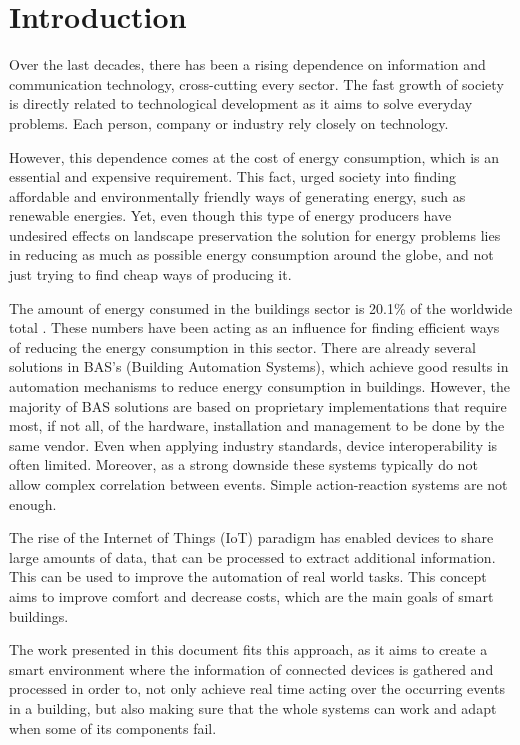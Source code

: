

\chapter{Introduction}
\label{chapter:introduction}

Over the last decades, there has been a rising dependence on information and communication technology, cross-cutting every sector. The fast growth of society is directly related to technological development as it aims to solve everyday problems. Each person, company or industry rely closely on technology.

However, this dependence comes at the cost of energy consumption, which is an essential and expensive requirement. This fact, urged society into finding affordable and environmentally friendly ways of generating energy, such as renewable energies. Yet, even though this type of energy producers have undesired effects on landscape preservation the solution for energy problems lies in reducing as much as possible energy consumption around the globe, and not just trying to find cheap ways of producing it.


The amount of energy consumed in the buildings sector is 20.1\% of the worldwide total \cite{BuildingEnergy}. These numbers have been acting as an influence for finding efficient ways of reducing the energy consumption in this sector. There are already several solutions in BAS’s (Building Automation Systems), which achieve good results in automation mechanisms to reduce energy consumption in buildings. However, the majority of BAS solutions are based on proprietary implementations that require most, if not all, of the hardware, installation and management to be done by the same vendor. Even when applying industry standards, device interoperability is often limited. Moreover, as a strong downside these systems typically do not allow complex correlation between events. Simple action-reaction systems are not enough.

The rise of the Internet of Things (IoT) paradigm has enabled devices to share large amounts of data, that can be processed to extract additional information. This can be used to improve the automation of real world tasks. This concept aims to improve comfort and decrease costs, which are the main goals of smart buildings.

The work presented in this document fits this approach, as it aims to create a smart environment where the information of connected devices is gathered and processed in order to, not only achieve real time acting over the occurring events in a building, but also making sure that the whole systems can work and adapt when some of its components fail.


